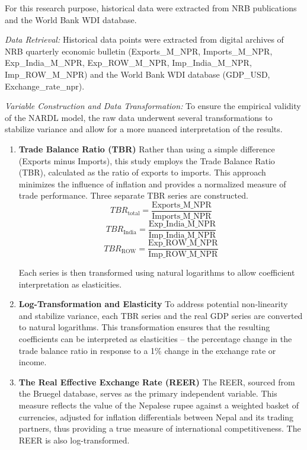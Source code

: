 \documentclass[12pt]{article}
\begin{document}
For this research purpose, historical data were extracted from NRB publications and the World Bank WDI database.

\noindent\textit{Data Retrieval:} Historical data points were extracted from digital archives of NRB quarterly economic bulletin (Exports\_M\_NPR, Imports\_M\_NPR, Exp\_India\_M\_NPR, Exp\_ROW\_M\_NPR, Imp\_India\_M\_NPR, Imp\_ROW\_M\_NPR) and the World Bank WDI database (GDP\_USD, Exchange\_rate\_npr).

\noindent\textit{Variable Construction and Data Transformation:} To ensure the empirical validity of the NARDL model, the raw data underwent several transformations to stabilize variance and allow for a more nuanced interpretation of the results.

\begin{enumerate}
    \item \textbf{Trade Balance Ratio (TBR)}  
    Rather than using a simple difference (Exports minus Imports), this study employs the Trade Balance Ratio (TBR), calculated as the ratio of exports to imports. This approach minimizes the influence of inflation and provides a normalized measure of trade performance. Three separate TBR series are constructed.
    \[TBR_{\text{total}} = \frac{\text{Exports\_M\_NPR}}{\text{Imports\_M\_NPR}}\]
    \[TBR_{\text{India}} = \frac{\text{Exp\_India\_M\_NPR}}{\text{Imp\_India\_M\_NPR}}\]
    \[TBR_{\text{ROW}} = \frac{\text{Exp\_ROW\_M\_NPR}}{\text{Imp\_ROW\_M\_NPR}}\]
   
    Each series is then transformed using natural logarithms to allow coefficient interpretation as elasticities.

    \item \textbf{Log-Transformation and Elasticity}  
    To address potential non-linearity and stabilize variance, each TBR series and the real GDP series are converted to natural logarithms. This transformation ensures that the resulting coefficients can be interpreted as elasticities – the percentage change in the trade balance ratio in response to a 1\% change in the exchange rate or income.

    \item \textbf{The Real Effective Exchange Rate (REER)}  
    The REER, sourced from the Bruegel database, serves as the primary independent variable. This measure reflects the value of the Nepalese rupee against a weighted basket of currencies, adjusted for inflation differentials between Nepal and its trading partners, thus providing a true measure of international competitiveness. The REER is also log-transformed.


\end{enumerate}
\end{document}
